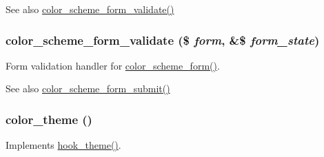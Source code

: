 \begin{DoxySeeAlso}{See also}
\hyperlink{color_8module_a1cc79136887d4ca5fdd82e8362d78f15}{color\_\-scheme\_\-form\_\-validate()} 
\end{DoxySeeAlso}
\hypertarget{color_8module_a1cc79136887d4ca5fdd82e8362d78f15}{
\subsubsection[{color\_\-scheme\_\-form\_\-validate}]{\setlength{\rightskip}{0pt plus 5cm}color\_\-scheme\_\-form\_\-validate (\$ {\em form}, \/  \&\$ {\em form\_\-state})}}
\label{color_8module_a1cc79136887d4ca5fdd82e8362d78f15}
Form validation handler for \hyperlink{group__forms_ga96d9b56f10f5a4d4178d43444732fb09}{color\_\-scheme\_\-form()}.

\begin{DoxySeeAlso}{See also}
\hyperlink{color_8module_a995f86a47f2e1456f113aa80c37b9a32}{color\_\-scheme\_\-form\_\-submit()} 
\end{DoxySeeAlso}
\hypertarget{color_8module_ac73d7e414c063c06b7f9eaa402cbdd55}{
\subsubsection[{color\_\-theme}]{\setlength{\rightskip}{0pt plus 5cm}color\_\-theme ()}}
\label{color_8module_ac73d7e414c063c06b7f9eaa402cbdd55}
Implements \hyperlink{group__hooks_ga013ccb45c7aaab1c16cf9691428c910d}{hook\_\-theme()}. 